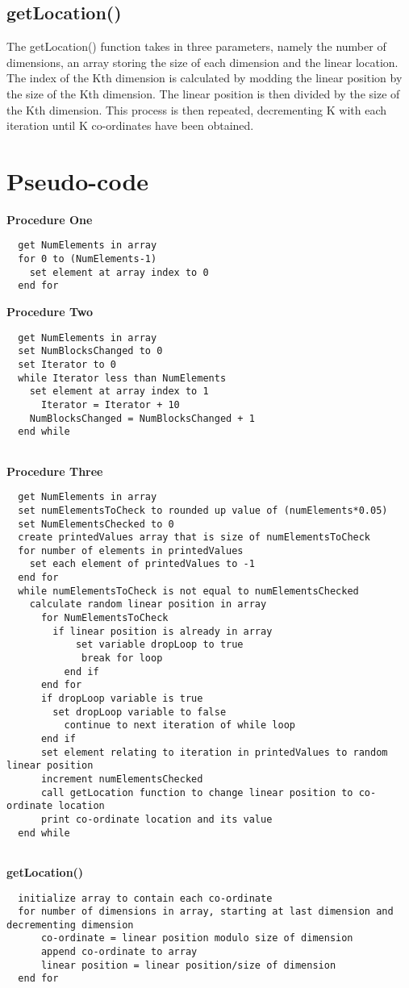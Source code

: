 \documentclass[10pt,onecolumn]{article}
\begin{document}
  \subsection*{getLocation()}
  The getLocation() function takes in three parameters, namely the number of dimensions, an array storing the size of each dimension and the linear location. The index of the Kth dimension is calculated by modding the linear position by the size of the Kth dimension. The linear position is then divided by the size of the Kth dimension. This process is then repeated, decrementing K with each iteration until K co-ordinates have been obtained. \\
  
  \section{Pseudo-code}
  
  \textbf{Procedure One}
  \begin{Verbatim}
  get NumElements in array
  for 0 to (NumElements-1)
    set element at array index to 0
  end for
  \end{Verbatim}
  \textbf{Procedure Two}
  \begin{Verbatim}
  get NumElements in array 
  set NumBlocksChanged to 0
  set Iterator to 0
  while Iterator less than NumElements
    set element at array index to 1
      Iterator = Iterator + 10
    NumBlocksChanged = NumBlocksChanged + 1
  end while
  
  \end{Verbatim}
  \textbf{Procedure Three}
  \begin{Verbatim}
  get NumElements in array
  set numElementsToCheck to rounded up value of (numElements*0.05)
  set NumElementsChecked to 0
  create printedValues array that is size of numElementsToCheck
  for number of elements in printedValues
    set each element of printedValues to -1
  end for
  while numElementsToCheck is not equal to numElementsChecked
    calculate random linear position in array 
      for NumElementsToCheck
        if linear position is already in array 
            set variable dropLoop to true
             break for loop
          end if
      end for
      if dropLoop variable is true
        set dropLoop variable to false 
          continue to next iteration of while loop
      end if
      set element relating to iteration in printedValues to random linear position
      increment numElementsChecked
      call getLocation function to change linear position to co-ordinate location
      print co-ordinate location and its value
  end while
  
  \end{Verbatim}
  \newpage
  \textbf{getLocation()}
  \begin{verbatim}
  initialize array to contain each co-ordinate
  for number of dimensions in array, starting at last dimension and decrementing dimension
      co-ordinate = linear position modulo size of dimension
      append co-ordinate to array 
      linear position = linear position/size of dimension
  end for
  \end{verbatim}
  
  
  
\end{document}
